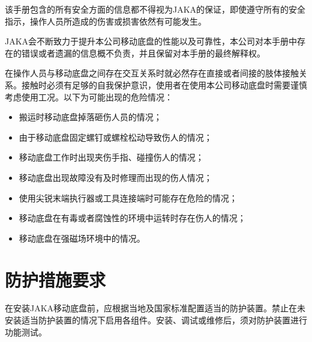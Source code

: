 \documentclass[a4paper,11pt,english,openany,oneside]{sphinxmanual}
\begin{document}
\sphinxAtStartPar
该手册包含的所有安全方面的信息都不得视为JAKA的保证，即使遵守所有的安全指示，操作人员所造成的伤害或损害依然有可能发生。

\sphinxAtStartPar
JAKA会不断致力于提升本公司移动底盘的性能以及可靠性，本公司对本手册中存在的错误或者遗漏的信息概不负责，并且保留对本手册的最终解释权。

\sphinxAtStartPar
{}

\sphinxAtStartPar
在操作人员与移动底盘之间存在交互关系时就必然存在直接或者间接的肢体接触关系。接触时必须有足够的自我保护意识，使用者在使用本公司移动底盘时需要谨慎考虑使用工况。以下为可能出现的危险情况：
\begin{itemize}
\item {} 
\sphinxAtStartPar
搬运时移动底盘掉落砸伤人员的情况；

\item {} 
\sphinxAtStartPar
由于移动底盘固定螺钉或螺栓松动导致伤人的情况；

\item {} 
\sphinxAtStartPar
移动底盘工作时出现夹伤手指、碰撞伤人的情况；

\item {} 
\sphinxAtStartPar
移动底盘出现故障没有及时修理而出现的伤人情况；

\item {} 
\sphinxAtStartPar
使用尖锐末端执行器或工具连接端时可能存在危险的情况；

\item {} 
\sphinxAtStartPar
移动底盘在有毒或者腐蚀性的环境中运转时存在伤人的情况；

\item {} 
\sphinxAtStartPar
移动底盘在强磁场环境中的情况。

\end{itemize}


\section{防护措施要求}
\label{\detokenize{05 _u5b89_u5168_u89c4_u8303:id8}}
\sphinxAtStartPar
在安装JAKA移动底盘前，应根据当地及国家标准配置适当的防护装置。禁止在未安装适当防护装置的情况下启用各组件。安装、调试或维修后，须对防护装置进行功能测试。
\end{document}
